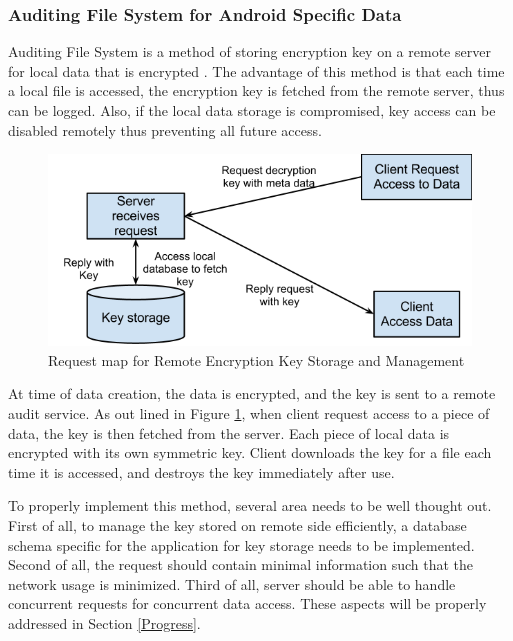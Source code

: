\subsubsection{Auditing File System for Android Specific Data}\label{LitRevAudit}

Auditing File System is a method of storing encryption key on a remote server for local data that is encrypted \cite{Cohen1997}. The advantage of this method is that each time a local file is accessed, the encryption key is fetched from the remote server, thus can be logged. Also, if the local data storage is compromised, key access can be disabled remotely thus preventing all future access.

\begin{figure}[h]
  \left
  \includegraphics[scale=0.65]{./Figs/remote_key_storage.png}
  \caption
  {Request map for Remote Encryption Key Storage and Management}
  \label{FigRemoteKeyStorage}
\end{figure}

At time of data creation, the data is encrypted, and the key is sent to a remote audit service. As out lined in Figure \ref{FigRemoteKeyStorage}, when client request access to a piece of data, the key is then fetched from the server. Each piece of local data is encrypted with its own symmetric key. Client downloads the key for a file each time it is accessed, and destroys the key immediately after use.

To properly implement this method, several area needs to be well thought out. First of all, to manage the key stored on remote side efficiently, a database schema specific for the application for key storage needs to be implemented. Second of all, the request should contain minimal information such that the network usage is minimized. Third of all, server should be able to handle concurrent requests for concurrent data access. These aspects will be properly addressed in Section \ref{Progress}.

